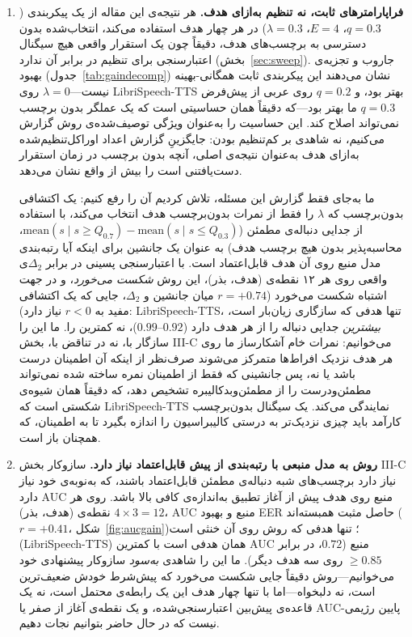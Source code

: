 \documentclass[a4paper,11pt]{article}
\begin{document}
\begin{enumerate}
\item \textbf{فراپارامترهای ثابت، نه تنظیم به‌ازای هدف.} هر نتیجه‌ی این
مقاله از یک پیکربندی ($q{=}0.3$، $E{=}4$، $\lambda{=}0.3$) در هر چهار هدف
استفاده می‌کند، انتخاب‌شده بدون دسترسی به برچسب‌های هدف، دقیقاً چون یک
استقرار واقعی هیچ سیگنال اعتبارسنجی برای تنظیم در برابر آن ندارد
(بخش~\ref{sec:sweep}). جاروب و تجزیه‌ی بهبود (جدول~\ref{tab:gaindecomp})
نشان می‌دهند این پیکربندی ثابت همگانی-بهینه نیست---$\lambda{=}0$ روی
LibriSpeech-TTS بهتر بود، و $q{=}0.2$ روی عربی از پیش‌فرض $q{=}0.3$ ما
بهتر بود---که دقیقاً همان حساسیتی است که یک عملگر بدون برچسب نمی‌تواند
اصلاح کند. این حساسیت را به‌عنوان ویژگی توصیف‌شده‌ی روش گزارش می‌کنیم، نه
شاهدی بر کم‌تنظیم بودن: جایگزینِ گزارش اعداد اوراکل‌تنظیم‌شده به‌ازای هدف
به‌عنوان نتیجه‌ی اصلی، آنچه بدون برچسب در زمان استقرار دست‌یافتنی است را
بیش از واقع نشان می‌دهد.

ما به‌جای فقط گزارش این مسئله، تلاش کردیم آن را رفع کنیم: یک اکتشافی
بدون‌برچسب که $\lambda$ را فقط از نمرات بدون‌برچسب هدف انتخاب می‌کند، با
استفاده از جدایی دنباله‌ی مطمئن ($\mathrm{mean}(s\mid s\!\geq\!Q_{0.7}) -
\mathrm{mean}(s\mid s\!\leq\!Q_{0.3})$، محاسبه‌پذیر بدون هیچ برچسب هدف) به
عنوان یک جانشین برای اینکه آیا رتبه‌بندی مدل منبع روی آن هدف قابل‌اعتماد
است. با اعتبارسنجی پسینی در برابر $\Delta_2$ی واقعی روی هر ۱۲ نقطه‌ی
(هدف، بذر)، این روش \emph{شکست می‌خورد}، و در جهت اشتباه شکست می‌خورد
($r{=}{+}0.74$ میان جانشین و $\Delta_2$، جایی که یک اکتشافی مفید به
$r{<}0$ نیاز دارد): LibriSpeech-TTS، تنها هدفی که سازگاری زیان‌بار است،
\emph{بیشترین} جدایی دنباله را از هر هدف دارد ($0.92$--$0.99$)، نه کمترین
را. ما این را سازگار با، نه در تناقض با، بخش III-C می‌خوانیم: نمرات خام
آشکارساز ما روی \emph{هر} هدف نزدیک افراط‌ها متمرکز می‌شوند صرف‌نظر از
اینکه آن اطمینان درست باشد یا نه، پس جانشینی که فقط از اطمینان نمره
ساخته شده نمی‌تواند مطمئن‌و‌درست را از مطمئن‌و‌بدکالیبره تشخیص دهد، که
دقیقاً همان شیوه‌ی شکستی است که LibriSpeech-TTS نمایندگی می‌کند. یک سیگنال
بدون‌برچسب کارآمد باید چیزی نزدیک‌تر به درستی کالیبراسیون را اندازه بگیرد
تا به اطمینان، که همچنان باز است.

\item \textbf{روش به مدل منبعی با رتبه‌بندی از پیش قابل‌اعتماد نیاز دارد.}
سازوکار بخش III-C نیاز دارد برچسب‌های شبه دنباله‌ی مطمئن قابل‌اعتماد
باشند، که به‌نوبه‌ی خود نیاز دارد AUC منبع روی هدف پیش از آغاز تطبیق
به‌اندازه‌ی کافی بالا باشد. روی هر $4\times3{=}12$ نقطه‌ی (هدف، بذر)، AUC
منبع و بهبود EER حاصل مثبت همبسته‌اند ($r{=}{+}0.41$،
شکل~\ref{fig:aucgain})؛ تنها هدفی که روش روی آن خنثی است
(LibriSpeech-TTS) همان هدفی است با کمترین AUC منبع ($0.72$، در برابر
$\geq\!0.85$ روی سه هدف دیگر). ما این را شاهدی \emph{به‌سود} سازوکار
پیشنهادی خود می‌خوانیم---روش دقیقاً جایی شکست می‌خورد که پیش‌شرط خودش
ضعیف‌ترین است، نه دلبخواه---اما با تنها چهار هدف این یک رابطه‌ی محتمل
است، نه یک قاعده‌ی پیش‌بین اعتبارسنجی‌شده، و یک نقطه‌ی آغاز از صفر یا
AUC-پایین رژیمی نیست که در حال حاضر بتوانیم نجات دهیم.


\end{enumerate}
\end{document}
